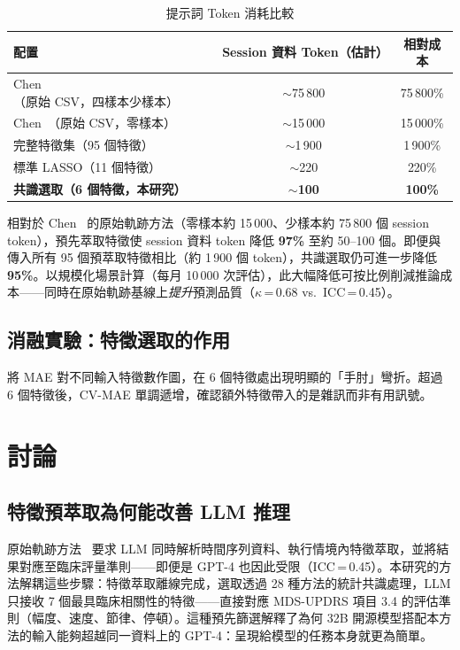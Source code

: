 \documentclass[12pt, a4paper]{article}
\begin{document}
\begin{table}[htbp]
    \centering
    \caption{提示詞 Token 消耗比較}
    \label{tab:tokens}
    \renewcommand{\arraystretch}{1.2}
    \begin{tabular}{lcc}
        \toprule
        \textbf{配置} & \textbf{Session 資料 Token（估計）} & \textbf{相對成本} \\
        \midrule
        Chen~\cite{chen2024chatgpt}（原始 CSV，四樣本少樣本）& $\sim$75\,800 & 75\,800\% \\
        Chen~\cite{chen2024chatgpt}（原始 CSV，零樣本）       & $\sim$15\,000 & 15\,000\% \\
        完整特徵集（95 個特徵）                               & $\sim$1\,900  &  1\,900\% \\
        標準 LASSO（11 個特徵）                               & $\sim$220     &    220\% \\
        \textbf{共識選取（6 個特徵，本研究）}                 & $\mathbf{\sim}$\textbf{100} & \textbf{100\%} \\
        \bottomrule
    \end{tabular}
\end{table}

相對於 Chen~\cite{chen2024chatgpt} 的原始軌跡方法（零樣本約 15\,000、少樣本約 75\,800 個 session token），預先萃取特徵使 session 資料 token 降低 \textbf{97\%} 至約 50--100 個。即便與傳入所有 95 個預萃取特徵相比（約 1\,900 個 token），共識選取仍可進一步降低 \textbf{95\%}。以規模化場景計算（每月 10\,000 次評估），此大幅降低可按比例削減推論成本——同時在原始軌跡基線上\emph{提升}預測品質（$\kappa$\,=\,0.68 vs.\ ICC\,=\,0.45）。

\subsection{消融實驗：特徵選取的作用}

將 MAE 對不同輸入特徵數作圖，在 6 個特徵處出現明顯的「手肘」彎折。超過 6 個特徵後，CV-MAE 單調遞增，確認額外特徵帶入的是雜訊而非有用訊號。

\section{討論}

\subsection{特徵預萃取為何能改善 LLM 推理}
原始軌跡方法~\cite{chen2024chatgpt} 要求 LLM 同時解析時間序列資料、執行情境內特徵萃取，並將結果對應至臨床評量準則——即便是 GPT-4 也因此受限（ICC\,=\,0.45）。本研究的方法解耦這些步驟：特徵萃取離線完成，選取透過 28 種方法的統計共識處理，LLM 只接收 7 個最具臨床相關性的特徵——直接對應 MDS-UPDRS 項目 3.4 的評估準則（幅度、速度、節律、停頓）。這種預先篩選解釋了為何 32B 開源模型搭配本方法的輸入能夠超越同一資料上的 GPT-4：呈現給模型的任務本身就更為簡單。
\end{document}
